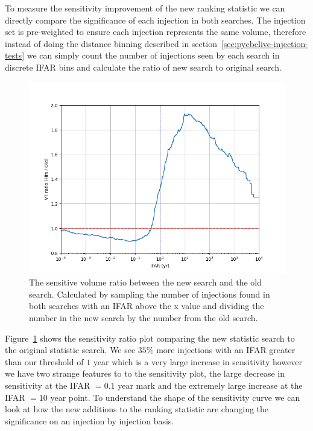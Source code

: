 
To measure the sensitivity improvement of the new ranking statistic we can directly compare the significance of each injection in both searches. The injection set is pre-weighted to ensure each injection represents the same volume, therefore instead of doing the distance binning described in section~\ref{sec:pycbclive-injection-tests} we can simply count the number of injections seen by each search in discrete IFAR bins and calculate the ratio of new search to original search.
%
\begin{figure}
  \centering
  \begin{minipage}[t]{1.0\linewidth}
  
    \includegraphics[width=1.0\textwidth]{images/5_pycbclive/ratio.png}
    \caption{The sensitive volume ratio between the new search and the old search. Calculated by sampling the number of injections found in both searches with an IFAR above the x value and dividing the number in the new search by the number from the old search.}
    \label{fig:pycbclive-psdvar-4s-sensitivity}

  \end{minipage}
\end{figure}
%
Figure~\ref{fig:pycbclive-psdvar-4s-sensitivity} shows the sensitivity ratio plot comparing the new statistic search to the original statistic search. We see $35\%$ more injections with an IFAR greater than our threshold of $1$ year which is a very large increase in sensitivity however we have two strange features to to the sensitivity plot, the large decrease in sensitivity at the IFAR $= 0.1$ year mark and the extremely large increase at the IFAR $= 10$ year point. To understand the shape of the sensitivity curve we can look at how the new additions to the ranking statistic are changing the significance on an injection by injection basis.

